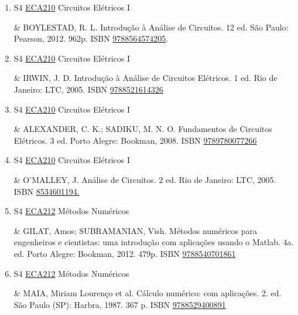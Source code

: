 \documentclass[12pt,a4paper]{book}
\begin{document}
\begin{enumerate}
 \item S4 \hyperref[PUD:ECA210]{ECA210} Circuitos Elétricos I

& BOYLESTAD, R.  L.  Introdução à Análise de Circuitos.  12 ed.  São Paulo: Pearson,
2012.  962p.  ISBN \href{http://www.bn.br/site/pages/servicosProfissionais/agenciaISBN/isbnBusca/FbnBuscaISBNCatalogo.asp?pField=ISBN&pIntPagina=1&pISBN=64574205&nidbISBN=true&hidbISBN=true}{9788564574205}.
 \item S4 \hyperref[PUD:ECA210]{ECA210} Circuitos Elétricos I

& IRWIN, J.  D.  Introdução à Análise de Circuitos Elétricos.  1 ed.  Rio de 
Janeiro: LTC, 2005.  ISBN \href{http://www.bn.br/site/pages/servicosProfissionais/agenciaISBN/isbnBusca/FbnBuscaISBNCatalogo.asp?pField=ISBN&pIntPagina=1&pISBN=21614326&nidbISBN=true&hidbISBN=true}{9788521614326} 
 

 \item S4 \hyperref[PUD:ECA210]{ECA210} Circuitos Elétricos I

& ALEXANDER, C.  K.;  SADIKU, M.  N.  O.  Fundamentos de Circuitos Elétricos.  
3 ed.  Porto Alegre: Bookman, 2008.  ISBN \href{http://www.google.com/search?hl=pt-BR&tbo=p&tbm=bks&q=isbn:9789780077266&num=10}{9789780077266}
 

 \item S4 \hyperref[PUD:ECA210]{ECA210} Circuitos Elétricos I

& O’MALLEY, J.  Análise de Circuitos.  2 ed.  Rio de Janeiro: LTC, 2005.  ISBN 
\href{http://www.google.com/search?hl=pt-BR&tbo=p&tbm=bks&q=isbn:8534601194.&num=10}{8534601194.}
 \item S4 \hyperref[PUD:ECA212]{ECA212} Métodos Numéricos

&  GILAT, Amos;  SUBRAMANIAN, Vish.  Métodos numéricos para engenheiros e cientistas: uma introdução com aplicações usando o Matlab.  4a.  ed.  Porto Alegre: Bookman, 2012.  479p.  ISBN \href{http://www.bn.br/site/pages/servicosProfissionais/agenciaISBN/isbnBusca/FbnBuscaISBNCatalogo.asp?pField=ISBN&pIntPagina=1&pISBN=40701861&nidbISBN=true&hidbISBN=true}{9788540701861}
 

 \item S4 \hyperref[PUD:ECA212]{ECA212} Métodos Numéricos

&  MAIA, Miriam Lourenço et al.  Cálculo numérico: com aplicações.  2. ed.  São Paulo (SP): Harbra, 1987.  367 p.  ISBN \href{http://www.bn.br/site/pages/servicosProfissionais/agenciaISBN/isbnBusca/FbnBuscaISBNCatalogo.asp?pField=ISBN&pIntPagina=1&pISBN=29400891&nidbISBN=true&hidbISBN=true}{9788529400891}
 


\end{enumerate}
\end{document}
